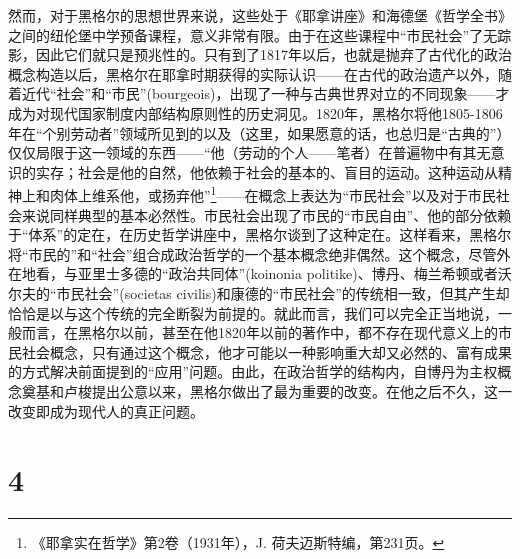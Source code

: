 然而，对于黑格尔的思想世界来说，这些处于《耶拿讲座》和海德堡《哲学全书》之间的纽伦堡中学预备课程，意义非常有限。由于在这些课程中“市民社会”了无踪影，因此它们就只是预兆性的。只有到了1817年以后，也就是抛弃了古代化的政治概念构造以后，黑格尔在耶拿时期获得的实际认识——在古代的政治遗产以外，随着近代“社会”和“市民”(bourgeois)，出现了一种与古典世界对立的不同现象——才成为对现代国家制度内部结构原则性的历史洞见。1820年，黑格尔将他1805-1806年在“个别劳动者”领域所见到的以及（这里，如果愿意的话，也总归是“古典的”）仅仅局限于这一领域的东西——“他（劳动的个人——笔者）在普遍物中有其无意识的实存；社会是他的自然，他依赖于社会的基本的、盲目的运动。这种运动从精神上和肉体上维系他，或扬弃他”\footnote{《耶拿实在哲学》第2卷（1931年），J. 荷夫迈斯特编，第231页。}——在概念上表达为“市民社会”以及对于市民社会来说同样典型的基本必然性。市民社会出现了市民的“市民自由”、他的部分依赖于“体系”的定在，在历史哲学讲座中，黑格尔谈到了这种定在。这样看来，黑格尔将“市民的”和“社会”组合成政治哲学的一个基本概念绝非偶然。这个概念，尽管外在地看，与亚里士多德的“政治共同体”(koinonia politike)、博丹、梅兰希顿或者沃尔夫的“市民社会”(societas civilis)和康德的“市民社会”的传统相一致，但其产生却恰恰是以与这个传统的完全断裂为前提的。就此而言，我们可以完全正当地说，一般而言，在黑格尔以前，甚至在他1820年以前的著作中，都不存在现代意义上的市民社会概念，只有通过这个概念，他才可能以一种影响重大却又必然的、富有成果的方式解决前面提到的“应用”问题。由此，在政治哲学的结构内，自博丹为主权概念奠基和卢梭提出公意以来，黑格尔做出了最为重要的改变。在他之后不久，这一改变即成为现代人的真正问题。

\section*{4}

